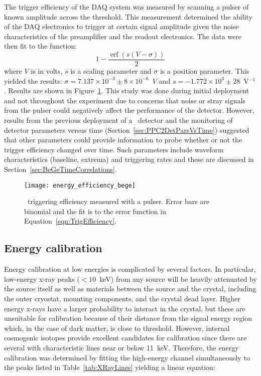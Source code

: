 The trigger efficiency of the DAQ system was measured by scanning a pulser of known amplitude across the threshold.  %
This measurement determined the ability of the DAQ electronics to trigger at certain signal amplitude given the noise characteristics of the preamplifier and the readout electronics.  The data were then fit to the function:
			\begin{equation}
				1 - \frac{\operatorname{erf} \left(s(V-\sigma)\right)}{2}
				\label{eqn:TrigEfficiency}
			\end{equation}
where $V$ is in volts, $s$ is a scaling parameter and $\sigma$ is a position parameter.  This yielded the results: $\sigma = 7.137\times10^{-3}\pm8\times10^{-6}$~$V$ and $s = -1.772\times10^{3}\pm28$~V$^{-1}$.  Results are shown in Figure~\ref{fig:BeGeTriggeringEfficiency}.  This study was done during initial deployment and not throughout the experiment due to concerns that noise or stray signals from the pulser could negatively affect the performance of the detector.  However, results from the previous deployment of a \ppc~detector and the monitoring of detector parameters versus time (Section~\ref{sec:PPC2DetParsVsTime}) suggested that other parameters could provide information to probe whether or not the trigger efficiency changed over time.  Such parameters include waveform characteristics (baseline, extrema) and triggering rates and these are discussed in Section~\ref{sec:BeGeTimeCorrelations}.

			\begin{figure}
				\centering
				\texttt{[image: energy\_efficiency\_bege]}
				\caption[\bege~triggering efficiency measured with a pulser]
				{\bege~triggering efficiency measured with a pulser.  Error bars are binomial and the fit is to the error function in
				Equation~\ref{eqn:TrigEfficiency}.}
				\label{fig:BeGeTriggeringEfficiency}
			\end{figure}

		\subsection{Energy calibration}

Energy calibration at low energies is complicated by several factors.  In particular, low-energy x-ray peaks ($<10$~keV) from any source will be heavily attenuated by the source itself as well as materials between the source and the crystal, including the outer cryostat, mounting components, and the crystal dead layer.  Higher energy x-rays have a larger probability to interact in the crystal, but these are unsuitable for calibration because of their distance from the signal energy region which, in the case of dark matter, is close to threshold.  However, internal cosmogenic isotopes provide excellent candidates for calibration since there are several with characteristic lines near or below 11~keV.  Therefore, the energy calibration was determined by fitting the high-energy channel simultaneously to the peaks listed in Table~\ref{tab:XRayLines} yielding a linear equation:

